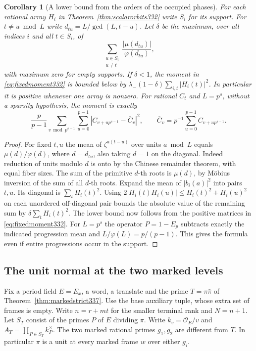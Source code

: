 \documentclass[a4paper,11pt]{article}
\newtheorem{corollary}[proposition]{Corollary}
\theoremstyle{definition}
\theoremstyle{remark}
\numberwithin{equation}{section}
\begin{document}
\begin{corollary}[A lower bound from the orders of the occupied phases]\leavevmode
\label{cor:separatedphases332}
For each rational array \(H_i\) in Theorem~\ref{thm:scalarorbits332}
write \(S_i\) for its support. For \(t\ne u\bmod L\) write
\(d_{tu}=L/\gcd(L,t-u)\). Let \(\delta\) be the maximum, over all indices
\(i\) and all \(t\in S_i\), of
\[
   \sum_{\substack{u\in S_i\\u\ne t}}
               \frac{|\mu(d_{tu})|}{\varphi(d_{tu})},
\]
with maximum zero for empty supports. If \(\delta<1\), the moment
in \eqref{eq:fixedmoment332} is bounded below by
\(\lambda_-(1-\delta)\sum_{i,t}|H_i(t)|^2\).
In particular it is positive whenever one array is nonzero.
For rational \(C_t\) and \(L=p^s\), without a sparsity hypothesis,
the moment is exactly
\[
 \frac{p}{p-1}\sum_{v\bmod p^{s-1}}\sum_{u=0}^{p-1}
       |C_{v+up^{s-1}}-\overline C_v|^2,\qquad
 \overline C_v=p^{-1}\sum_{u=0}^{p-1}C_{v+up^{s-1}} .
\]
\end{corollary}
\begin{proof}
For fixed \(t,u\) the mean of \(\zeta^{a(t-u)}\) over units \(a\bmod L\)
equals \(\mu(d)/\varphi(d)\), where \(d=d_{tu}\), also taking
\(d=1\) on the diagonal. Indeed reduction of units modulo \(d\) is
onto by the Chinese remainder theorem, with equal fiber sizes. The
sum of the primitive \(d\)-th roots is \(\mu(d)\), by M\"obius
inversion of the sum of all \(d\)-th roots. Expand the mean of
\(|b_i(a)|^2\) into pairs \(t,u\). Its diagonal is
\(\sum_t H_i(t)^2\). Using
\(2|H_i(t)H_i(u)|\le H_i(t)^2+H_i(u)^2\) on each unordered
off-diagonal pair bounds the absolute value of the remaining sum
by \(\delta\sum_t H_i(t)^2\). The lower bound now follows from the
positive matrices in \eqref{eq:fixedmoment332}. For \(L=p^s\) the
operator \(P=1-E_p\) subtracts exactly the indicated progression
mean and \(L/\varphi(L)=p/(p-1)\). This gives the formula even
if entire progressions occur in the support.
\end{proof}


\subsection{The unit normal at the two marked levels}\label{sec:markedline350}

Fix a period field \(E=E_x\), a word, a translate and the prime
\(T=\pi\bar\pi\) of Theorem~\ref{thm:markedstrict337}. Use the
base auxiliary tuple, whose extra set of frames is empty. Write
\(n=r+mt\) for the smaller terminal rank and \(N=n+1\).
Let \(S_T\) consist of the primes \(P\) of \(E\) dividing \(\pi\).
Write \(k_v=\mathcal O_E/v\) and \(A_T=\prod_{P\in S_T}k_P^\times\).
The two marked rational primes \(g_1,g_2\) are different from \(T\).
In particular \(\pi\) is a unit at every marked frame \(w\) over
either \(g_i\).
\end{document}
